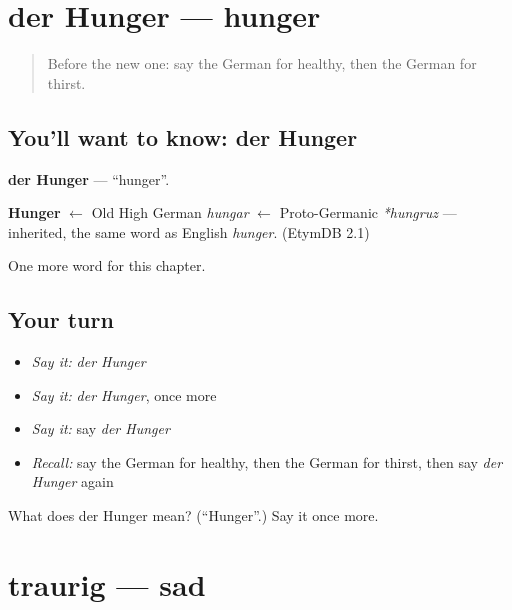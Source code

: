 \section[der Hunger]{der Hunger — hunger}

\label{lesson:GE-C60-hunger}



\begin{quote}
Before the new one: say the German for healthy, then the German for thirst.
\end{quote}

\subsection*{You'll want to know: der Hunger}
\textbf{der Hunger} — \textquotedblleft{}hunger\textquotedblright{}.

\begin{cousinweb}
\textbf{Hunger} $\leftarrow$ Old High German \emph{hungar} $\leftarrow$ Proto-Germanic \emph{*hungruz} — inherited, the same word as English \emph{hunger}. (EtymDB 2.1)
\end{cousinweb}

\begin{grammarlens}[title={What you've built}]
One more word for this chapter.
\end{grammarlens}

\subsection*{Your turn}
\begin{itemize}
\raggedright
  \item \emph{Say it:} \emph{der Hunger}
  \item \emph{Say it:} \emph{der Hunger}, once more
  \item \emph{Say it:} say \emph{der Hunger}
  \item \emph{Recall:} say the German for healthy, then the German for thirst, then say \emph{der Hunger} again
\end{itemize}

\begin{tcolorbox}[breakable,colback=teal!4,colframe=teal!35!black,title={Before you move on}]
What does der Hunger mean? (\textquotedblleft{}Hunger\textquotedblright{}.) Say it once more.
\end{tcolorbox}
\section[traurig]{traurig — sad}

